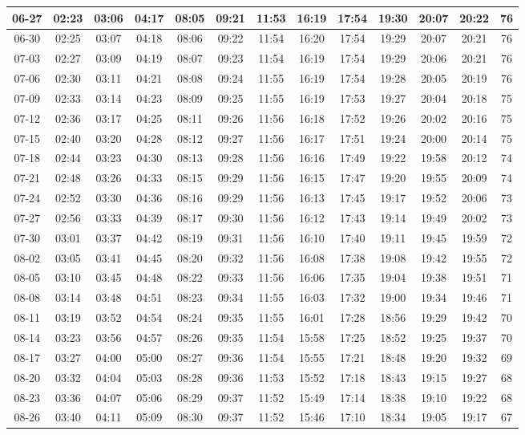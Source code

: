 \begin{footnotesize}
\begin{longtable}{c | c | c | c | c | c | c | c | c | c | c | c | c}
		06-27&02:23&03:06&04:17&08:05&09:21&11:53&16:19&17:54&19:30&20:07&20:22&76\\\hline
		06-30&02:25&03:07&04:18&08:06&09:22&11:54&16:20&17:54&19:29&20:07&20:21&76\\\hline
		07-03&02:27&03:09&04:19&08:07&09:23&11:54&16:19&17:54&19:29&20:06&20:21&76\\\hline
		07-06&02:30&03:11&04:21&08:08&09:24&11:55&16:19&17:54&19:28&20:05&20:19&76\\\hline
		07-09&02:33&03:14&04:23&08:09&09:25&11:55&16:19&17:53&19:27&20:04&20:18&75\\\hline
		07-12&02:36&03:17&04:25&08:11&09:26&11:56&16:18&17:52&19:26&20:02&20:16&75\\\hline
		07-15&02:40&03:20&04:28&08:12&09:27&11:56&16:17&17:51&19:24&20:00&20:14&75\\\hline
		07-18&02:44&03:23&04:30&08:13&09:28&11:56&16:16&17:49&19:22&19:58&20:12&74\\\hline
		07-21&02:48&03:26&04:33&08:15&09:29&11:56&16:15&17:47&19:20&19:55&20:09&74\\\hline
		07-24&02:52&03:30&04:36&08:16&09:29&11:56&16:13&17:45&19:17&19:52&20:06&73\\\hline
		07-27&02:56&03:33&04:39&08:17&09:30&11:56&16:12&17:43&19:14&19:49&20:02&73\\\hline
		07-30&03:01&03:37&04:42&08:19&09:31&11:56&16:10&17:40&19:11&19:45&19:59&72\\\hline
		08-02&03:05&03:41&04:45&08:20&09:32&11:56&16:08&17:38&19:08&19:42&19:55&72\\\hline
		08-05&03:10&03:45&04:48&08:22&09:33&11:56&16:06&17:35&19:04&19:38&19:51&71\\\hline
		08-08&03:14&03:48&04:51&08:23&09:34&11:55&16:03&17:32&19:00&19:34&19:46&71\\\hline
		08-11&03:19&03:52&04:54&08:24&09:35&11:55&16:01&17:28&18:56&19:29&19:42&70\\\hline
		08-14&03:23&03:56&04:57&08:26&09:35&11:54&15:58&17:25&18:52&19:25&19:37&70\\\hline
		08-17&03:27&04:00&05:00&08:27&09:36&11:54&15:55&17:21&18:48&19:20&19:32&69\\\hline
		08-20&03:32&04:04&05:03&08:28&09:36&11:53&15:52&17:18&18:43&19:15&19:27&68\\\hline
		08-23&03:36&04:07&05:06&08:29&09:37&11:52&15:49&17:14&18:38&19:10&19:22&68\\\hline
		08-26&03:40&04:11&05:09&08:30&09:37&11:52&15:46&17:10&18:34&19:05&19:17&67\\\hline

\end{longtable}
\end{footnotesize}
